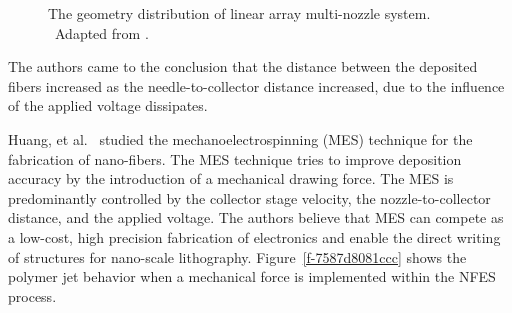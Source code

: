 \bgroup
\begin{figure}[!htbp]
\centering \makeatletter{}
\makeatother 
\caption[Geometry Distribution of Linear Array Multi-Nozzle System]{The geometry distribution of linear array multi-nozzle system. \unskip~\protect Adapted from \cite{527120:11974323}.}
\label{f-4a1a1f58a423}
\end{figure}
\egroup
The authors came to the conclusion that the distance between the deposited fibers increased as the needle-to-collector distance increased, due to the influence of the applied voltage dissipates.

Huang, et al.\unskip~\cite{527120:11974311} studied the mechanoelectrospinning (MES) technique for the fabrication of nano-fibers. The MES technique tries to improve deposition accuracy by the introduction of a mechanical drawing force. The MES is predominantly controlled by the collector stage velocity, the nozzle-to-collector distance, and the applied voltage. The authors believe that MES can compete as a low-cost, high precision fabrication of electronics and enable the direct writing of structures for nano-scale lithography. Figure~\ref{f-7587d8081ccc} shows the polymer jet behavior when a mechanical force is implemented within the NFES process.


